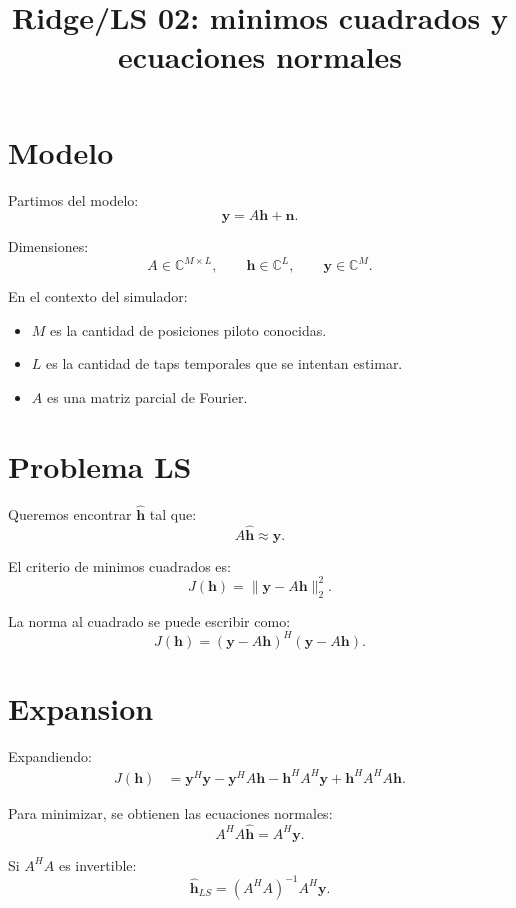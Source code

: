 \documentclass[11pt]{article}
\title{Ridge/LS 02: minimos cuadrados y ecuaciones normales}
\author{}
\date{}
\begin{document}
\maketitle

\section{Modelo}

Partimos del modelo:
\[
    \bm y = A\bm h + \bm n.
\]

Dimensiones:
\[
    A \in \mathbb{C}^{M\times L},
    \qquad
    \bm h \in \mathbb{C}^{L},
    \qquad
    \bm y \in \mathbb{C}^{M}.
\]

En el contexto del simulador:

\begin{itemize}
    \item \(M\) es la cantidad de posiciones piloto conocidas.
    \item \(L\) es la cantidad de taps temporales que se intentan estimar.
    \item \(A\) es una matriz parcial de Fourier.
\end{itemize}

\section{Problema LS}

Queremos encontrar \(\hat{\bm h}\) tal que:
\[
    A\hat{\bm h} \approx \bm y.
\]

El criterio de minimos cuadrados es:
\[
    J(\bm h) = \|\bm y - A\bm h\|_2^2.
\]

La norma al cuadrado se puede escribir como:
\[
    J(\bm h)
    =
    (\bm y - A\bm h)^H(\bm y - A\bm h).
\]

\section{Expansion}

Expandiendo:
\[
\begin{aligned}
    J(\bm h)
    &=
    \bm y^H\bm y
    - \bm y^H A\bm h
    - \bm h^H A^H \bm y
    + \bm h^H A^H A\bm h.
\end{aligned}
\]

Para minimizar, se obtienen las ecuaciones normales:
\[
    A^H A\hat{\bm h} = A^H\bm y.
\]

Si \(A^H A\) es invertible:
\[
    \hat{\bm h}_{LS}
    =
    (A^H A)^{-1}A^H\bm y.
\]
\end{document}
